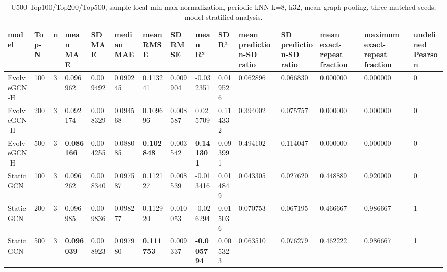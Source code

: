 \begin{table}
\centering
\small
\caption{U500 Top100/Top200/Top500, sample-local min-max normalization, periodic kNN k=8, h32, mean graph pooling, three matched seeds; model-stratified analysis.}
\begin{tabular}{lllllllllllllll}
\hline
model & Top-N & n & mean MAE & SD MAE & median MAE & mean RMSE & SD RMSE & mean R² & SD R² & mean prediction-SD ratio & SD prediction-SD ratio & mean exact-repeat fraction & maximum exact-repeat fraction & undefined Pearson \\
\hline
EvolveGCN-H & 100 & 3 & 0.096962 & 0.009492 & 0.099245 & 0.113241 & 0.009904 & -0.032351 & 0.019526 & 0.062896 & 0.066830 & 0.000000 & 0.000000 & 0 \\
EvolveGCN-H & 200 & 3 & 0.092174 & 0.008329 & 0.094568 & 0.109696 & 0.008587 & 0.025709 & 0.114332 & 0.394002 & 0.075757 & 0.000000 & 0.000000 & 0 \\
EvolveGCN-H & 500 & 3 & \textbf{0.086166} & 0.004255 & 0.088085 & \textbf{0.102848} & 0.003542 & \textbf{0.141301} & 0.093991 & 0.494102 & 0.114047 & 0.000000 & 0.000000 & 0 \\
Static GCN & 100 & 3 & 0.096262 & 0.008340 & 0.097587 & 0.112127 & 0.008539 & -0.013416 & 0.014849 & 0.043305 & 0.027620 & 0.448889 & 0.920000 & 0 \\
Static GCN & 200 & 3 & 0.096985 & 0.009836 & 0.098277 & 0.112920 & 0.010053 & -0.026294 & 0.015036 & 0.070753 & 0.067195 & 0.466667 & 0.986667 & 1 \\
Static GCN & 500 & 3 & \textbf{0.096039} & 0.008923 & 0.097980 & \textbf{0.111753} & 0.009337 & \textbf{-0.005794} & 0.005323 & 0.063510 & 0.076279 & 0.462222 & 0.986667 & 1 \\
\hline
\end{tabular}
\end{table}
